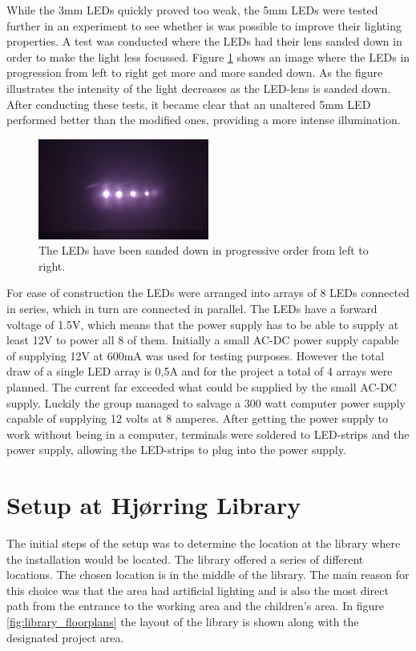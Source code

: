 While the 3mm LEDs quickly proved too weak, the 5mm LEDs were tested further in an experiment to see whether is was possible to improve their lighting properties. A test was conducted where the LEDs had their lens sanded down in order to make the light less focussed. Figure \ref{fig:leds_sanded} shows an image where the LEDs in progression from left to right get more and more sanded down. As the figure illustrates the intensity of the light decreases as the LED-lens is sanded down. After conducting these tests, it became clear that an unaltered 5mm LED performed better than the modified ones, providing a more intense illumination.

\begin{figure} [htbp]
\centering
\includegraphics[width=0.50\textwidth]{Pictures/Theory/sanded_leds.jpg}
\caption{The LEDs have been sanded down in progressive order from left to right.}
\label{fig:leds_sanded}
\end{figure}

For ease of construction the LEDs were arranged into arrays of 8 LEDs connected in series, which in turn are connected in parallel. The LEDs have a forward voltage of 1.5V, which means that the power supply has to be able to supply at least 12V to power all 8 of them. Initially a small AC-DC power supply capable of supplying 12V at 600mA was used for testing purposes. However the total draw of a single LED array is 0,5A and for the project a total of 4 arrays were planned. The current far exceeded what could be supplied by the small AC-DC supply. Luckily the group managed to salvage a 300 watt computer power supply capable of supplying 12 volts at 8 amperes. After getting the power supply to work without being in a computer, terminals were soldered to LED-strips and the power supply, allowing the LED-strips to plug into the power supply.

\section{Setup at Hj{\o}rring Library}
The initial steps of the setup was to determine the location at the library where the installation would be located. The library offered a series of different locations. The chosen location is in the middle of the library. The main reason for this choice was that the area had artificial lighting and is also the most direct path from the entrance to the working area and the children's area. In figure \ref{fig:library_floorplans} the layout of the library is shown along with the designated project area.

